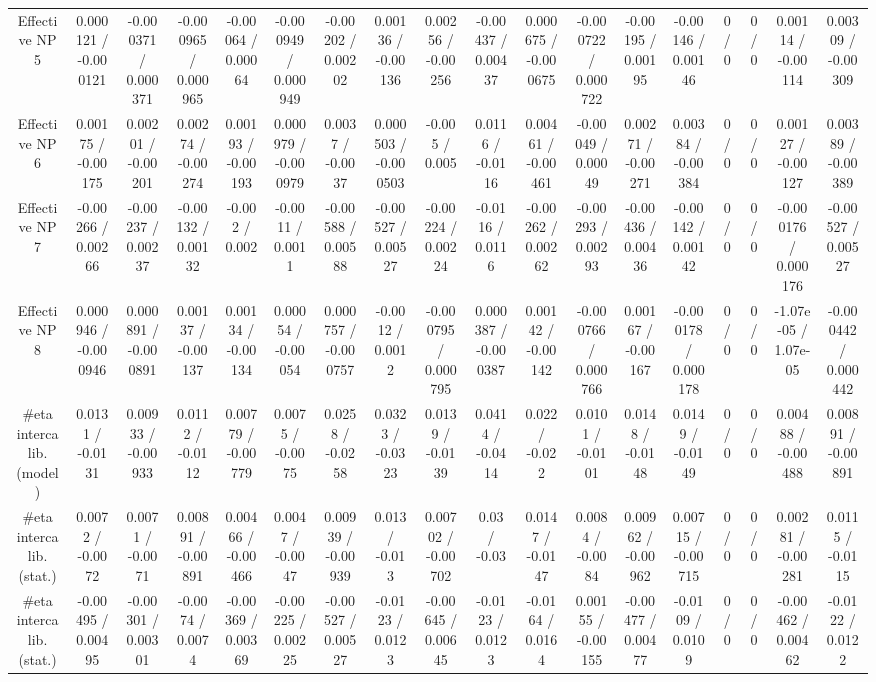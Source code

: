 \documentclass[10pt]{article}
\begin{document}
\begin{table}[htbp]
\begin{center}
\begin{tabular}{|c|c|c|c|c|c|c|c|c|c|c|c|c|c|c|c|c|c|}
  Effective NP 5 & 0.000121 / -0.000121 & -0.000371 / 0.000371 & -0.000965 / 0.000965 & -0.00064 / 0.00064 & -0.000949 / 0.000949 & -0.00202 / 0.00202 & 0.00136 / -0.00136 & 0.00256 / -0.00256 & -0.00437 / 0.00437 & 0.000675 / -0.000675 & -0.000722 / 0.000722 & -0.00195 / 0.00195 & -0.00146 / 0.00146 & 0 / 0 & 0 / 0 & 0.00114 / -0.00114 & 0.00309 / -0.00309 \\ 
  Effective NP 6 & 0.00175 / -0.00175 & 0.00201 / -0.00201 & 0.00274 / -0.00274 & 0.00193 / -0.00193 & 0.000979 / -0.000979 & 0.0037 / -0.0037 & 0.000503 / -0.000503 & -0.005 / 0.005 & 0.0116 / -0.0116 & 0.00461 / -0.00461 & -0.00049 / 0.00049 & 0.00271 / -0.00271 & 0.00384 / -0.00384 & 0 / 0 & 0 / 0 & 0.00127 / -0.00127 & 0.00389 / -0.00389 \\ 
  Effective NP 7 & -0.00266 / 0.00266 & -0.00237 / 0.00237 & -0.00132 / 0.00132 & -0.002 / 0.002 & -0.0011 / 0.0011 & -0.00588 / 0.00588 & -0.00527 / 0.00527 & -0.00224 / 0.00224 & -0.0116 / 0.0116 & -0.00262 / 0.00262 & -0.00293 / 0.00293 & -0.00436 / 0.00436 & -0.00142 / 0.00142 & 0 / 0 & 0 / 0 & -0.000176 / 0.000176 & -0.00527 / 0.00527 \\ 
  Effective NP 8 & 0.000946 / -0.000946 & 0.000891 / -0.000891 & 0.00137 / -0.00137 & 0.00134 / -0.00134 & 0.00054 / -0.00054 & 0.000757 / -0.000757 & -0.0012 / 0.0012 & -0.000795 / 0.000795 & 0.000387 / -0.000387 & 0.00142 / -0.00142 & -0.000766 / 0.000766 & 0.00167 / -0.00167 & -0.000178 / 0.000178 & 0 / 0 & 0 / 0 & -1.07e-05 / 1.07e-05 & -0.000442 / 0.000442 \\ 
  #eta intercalib. (model) & 0.0131 / -0.0131 & 0.00933 / -0.00933 & 0.0112 / -0.0112 & 0.00779 / -0.00779 & 0.0075 / -0.0075 & 0.0258 / -0.0258 & 0.0323 / -0.0323 & 0.0139 / -0.0139 & 0.0414 / -0.0414 & 0.022 / -0.022 & 0.0101 / -0.0101 & 0.0148 / -0.0148 & 0.0149 / -0.0149 & 0 / 0 & 0 / 0 & 0.00488 / -0.00488 & 0.00891 / -0.00891 \\ 
  #eta intercalib. (stat.) & 0.0072 / -0.0072 & 0.0071 / -0.0071 & 0.00891 / -0.00891 & 0.00466 / -0.00466 & 0.0047 / -0.0047 & 0.00939 / -0.00939 & 0.013 / -0.013 & 0.00702 / -0.00702 & 0.03 / -0.03 & 0.0147 / -0.0147 & 0.0084 / -0.0084 & 0.00962 / -0.00962 & 0.00715 / -0.00715 & 0 / 0 & 0 / 0 & 0.00281 / -0.00281 & 0.0115 / -0.0115 \\ 
  #eta intercalib. (stat.) & -0.00495 / 0.00495 & -0.00301 / 0.00301 & -0.0074 / 0.0074 & -0.00369 / 0.00369 & -0.00225 / 0.00225 & -0.00527 / 0.00527 & -0.0123 / 0.0123 & -0.00645 / 0.00645 & -0.0123 / 0.0123 & -0.0164 / 0.0164 & 0.00155 / -0.00155 & -0.00477 / 0.00477 & -0.0109 / 0.0109 & 0 / 0 & 0 / 0 & -0.00462 / 0.00462 & -0.0122 / 0.0122 \\ 

\end{tabular}
\end{center}
\end{table}
\end{document}
